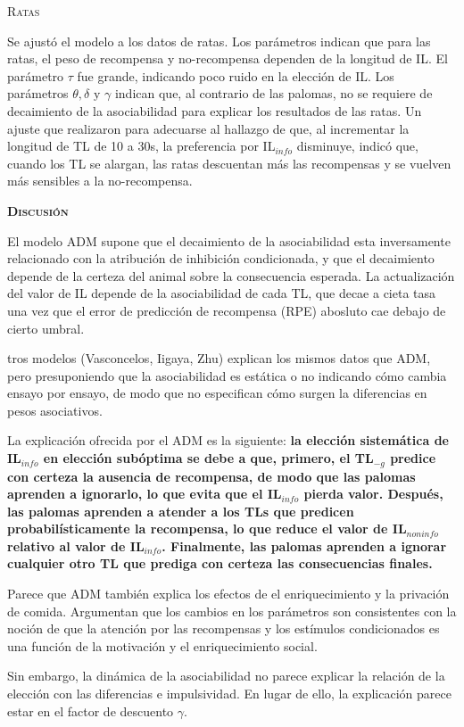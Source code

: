 \documentclass[a4paper,12pt]{article}
\begin{document}
{\scshape Ratas}

Se ajustó el modelo a los datos de ratas. Los parámetros indican que para las ratas, el peso de recompensa y no-recompensa dependen de la longitud de IL. El parámetro $\tau$ fue grande, indicando poco ruido en la elección de IL. Los parámetros $\theta,\delta \mbox{ y } \gamma$ indican que, al contrario de las palomas, no se requiere de decaimiento de la asociabilidad para explicar los resultados de las ratas. Un ajuste que realizaron para adecuarse al hallazgo de que, al incrementar la longitud de TL de 10 a 30s, la preferencia por IL$_{info}$ disminuye, indicó que, cuando los TL se alargan, las ratas descuentan más las recompensas y se vuelven más sensibles a la no-recompensa.

{\scshape\bfseries Discusión}

El modelo ADM supone que el decaimiento de la asociabilidad esta inversamente relacionado con la atribución de inhibición condicionada, y que el decaimiento depende de la certeza del animal sobre la consecuencia esperada. La actualización del valor de IL depende de la asociabilidad de cada TL, que decae a cieta tasa una vez que el error de predicción de recompensa (RPE) abosluto cae debajo de cierto umbral.

tros modelos (Vasconcelos, Iigaya, Zhu) explican los mismos datos que ADM, pero presuponiendo que la asociabilidad es estática o no indicando cómo cambia ensayo por ensayo, de modo que no especifican cómo surgen la diferencias en pesos asociativos.

La explicación ofrecida por el ADM es la siguiente: {\bfseries la elección sistemática de IL$_{info}$ en elección subóptima se debe a que, primero, el TL$_{-g}$ predice con certeza la ausencia de recompensa, de modo que las palomas aprenden a ignorarlo, lo que evita que el IL$_{info}$ pierda valor. Después, las palomas aprenden a atender a los TLs que predicen probabilísticamente la recompensa, lo que reduce el valor de IL$_{noninfo}$ relativo al valor de IL$_{info}$. Finalmente, las palomas aprenden a ignorar cualquier otro TL que prediga con certeza las consecuencias finales.}

Parece que ADM también explica los efectos de el enriquecimiento y la privación de comida. Argumentan que los cambios en los parámetros son consistentes con la noción de que la atención por las recompensas y los estímulos condicionados es una función de la motivación y el enriquecimiento social.

Sin embargo, la dinámica de la asociabilidad no parece explicar la relación de la elección con las diferencias e impulsividad. En lugar de ello, la explicación parece estar en el factor de descuento $\gamma$.
\end{document}
